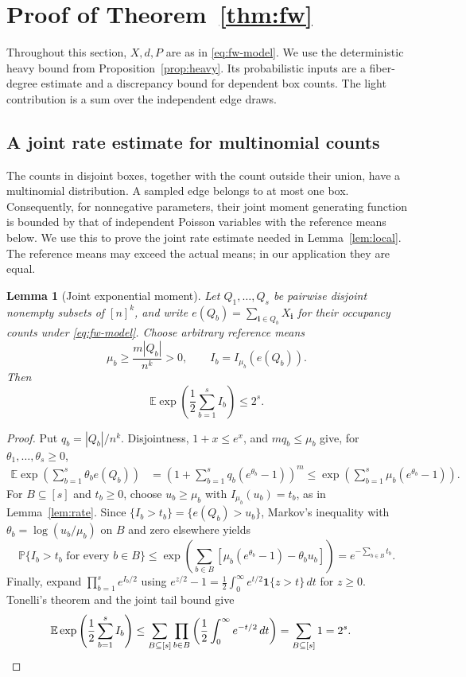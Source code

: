 \documentclass[10pt,a4paper]{amsart}
\numberwithin{equation}{section}
\newtheorem{lemma}[theorem]{Lemma}
\newcommand{\E}{\mathbb E}
\newcommand{\Pp}{\mathbb P}
\newcommand{\one}{\mathbf 1}
\begin{document}
\section{Proof of Theorem~\ref{thm:fw}}\label{sec:fw-proof}

Throughout this section, $X,d,P$ are as in \eqref{eq:fw-model}.
We use the deterministic heavy bound from Proposition~\ref{prop:heavy}.
Its probabilistic inputs are a fiber-degree estimate and a discrepancy
bound for dependent box counts. The light contribution is a sum over
the independent edge draws.

\subsection{A joint rate estimate for multinomial counts}

The counts in disjoint boxes, together with the count outside their
union, have a multinomial distribution. A sampled edge belongs to at
most one box. Consequently, for nonnegative parameters, their joint
moment generating function is bounded by that of independent Poisson
variables with the reference means below. We use this to prove the
joint rate estimate needed in Lemma~\ref{lem:local}. The reference
means may exceed the actual means; in our application they are equal.

\begin{lemma}[Joint exponential moment]\label{lem:multinomial}
Let $Q_1,\ldots,Q_s$ be pairwise disjoint nonempty subsets of $[n]^k$,
and write $e(Q_b)=\sum_{\mathbf i\in Q_b}X_{\mathbf i}$ for their
occupancy counts under \eqref{eq:fw-model}.
Choose arbitrary reference means
\[
 \mu_b\ge \frac{m|Q_b|}{n^k}>0,
 \qquad I_b=I_{\mu_b}(e(Q_b)).
\]
Then
\begin{equation}\label{eq:mixed-mgf}
 \E\exp\left(\frac12\sum_{b=1}^s I_b\right)\le2^s.
\end{equation}
\end{lemma}
\begin{proof}
Put $q_b=|Q_b|/n^k$. Disjointness, $1+x\le e^x$, and
$mq_b\le\mu_b$ give, for $\theta_1,\ldots,\theta_s\ge0$,
\begin{align*}
 \E\exp\left(\sum_{b=1}^s\theta_be(Q_b)\right)
 &=\left(1+\sum_{b=1}^s q_b(e^{\theta_b}-1)\right)^m\le\exp\left(\sum_{b=1}^s\mu_b(e^{\theta_b}-1)\right).
\end{align*}
For $B\subseteq[s]$ and $t_b\ge0$, choose $u_b\ge\mu_b$ with
$I_{\mu_b}(u_b)=t_b$, as in Lemma~\ref{lem:rate}.
Since $\{I_b>t_b\}=\{e(Q_b)>u_b\}$, Markov's inequality with
$\theta_b=\log(u_b/\mu_b)$ on $B$ and zero elsewhere yields
\[
 \Pp\{I_b>t_b\text{ for every }b\in B\}
 \le \exp\left(\sum_{b\in B}
       [\mu_b(e^{\theta_b}-1)-\theta_bu_b]\right)
 =e^{-\sum_{b\in B}t_b}.
\]
Finally, expand $\prod_{b=1}^s e^{I_b/2}$ using
$e^{z/2}-1=\frac12\int_0^\infty e^{t/2}\one\{z>t\}\,dt$ for $z\ge0$.
Tonelli's theorem and the joint tail bound give
\begin{align*}
 \E\exp\left(\frac12\sum_{b=1}^s I_b\right)
 &\le\sum_{B\subseteq[s]}\prod_{b\in B}
 \left(\frac12\int_0^\infty e^{-t/2}\,dt\right)
 =\sum_{B\subseteq[s]}1=2^s.
 \qedhere
\end{align*}
\end{proof}
\end{document}
